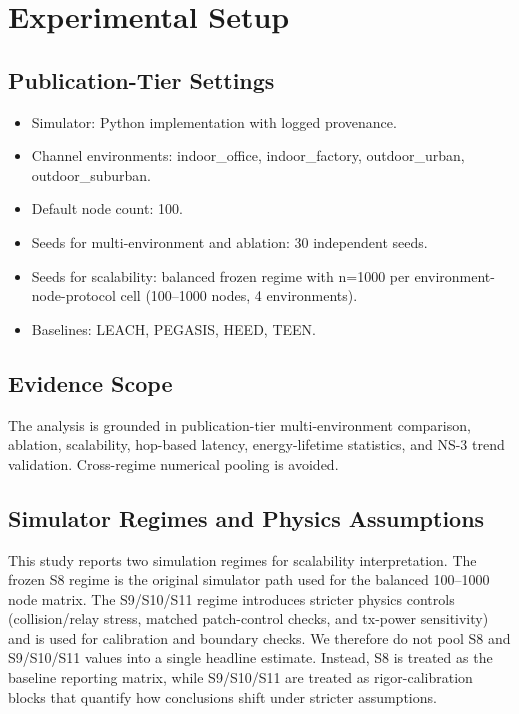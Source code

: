 \documentclass[sensors,article,submit,moreauthors,pdftex]{Definitions/mdpi}
\begin{document}
\section{Experimental Setup}
\subsection{Publication-Tier Settings}
\begin{itemize}
\item Simulator: Python implementation with logged provenance.
\item Channel environments: indoor\_office, indoor\_factory, outdoor\_urban, outdoor\_suburban.
\item Default node count: 100.
\item Seeds for multi-environment and ablation: 30 independent seeds.
\item Seeds for scalability: balanced frozen regime with n=1000 per environment-node-protocol cell (100--1000 nodes, 4 environments).
\item Baselines: LEACH, PEGASIS, HEED, TEEN.
\end{itemize}

\subsection{Evidence Scope}
The analysis is grounded in publication-tier multi-environment comparison, ablation, scalability, hop-based latency, energy-lifetime statistics, and NS-3 trend validation. Cross-regime numerical pooling is avoided.

\subsection{Simulator Regimes and Physics Assumptions}
This study reports two simulation regimes for scalability interpretation. The frozen S8 regime is the original simulator path used for the balanced 100--1000 node matrix. The S9/S10/S11 regime introduces stricter physics controls (collision/relay stress, matched patch-control checks, and tx-power sensitivity) and is used for calibration and boundary checks. We therefore do not pool S8 and S9/S10/S11 values into a single headline estimate. Instead, S8 is treated as the baseline reporting matrix, while S9/S10/S11 are treated as rigor-calibration blocks that quantify how conclusions shift under stricter assumptions.
\end{document}
